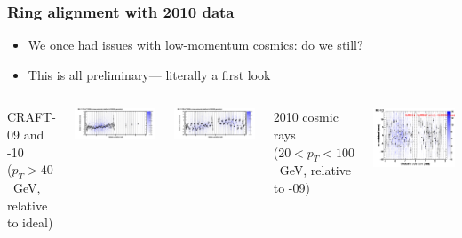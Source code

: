 \documentclass[compress]{beamer}
\begin{document}
\begin{frame}
\frametitle{Ring alignment with 2010 data}

\begin{itemize}
\item We once had issues with low-momentum cosmics: do we still?
\item This is all preliminary--- literally a first look
\end{itemize}

\begin{columns}

CRAFT-09 and -10 \\ {\scriptsize ($p_T > 40$~GeV, relative to ideal)}

\vspace{0.2 cm}
\includegraphics[width=\linewidth]{alternation_2008_mem12_design.png}

\includegraphics[width=\linewidth]{alternation_2009_mem12_design.png}


2010 cosmic rays \\ {\scriptsize ($20 < p_T < 100$~GeV, relative to -09)}

\vspace{0.2 cm}
\includegraphics[width=\linewidth]{sawtooth.png}


\end{columns}
\end{frame}
\end{document}
